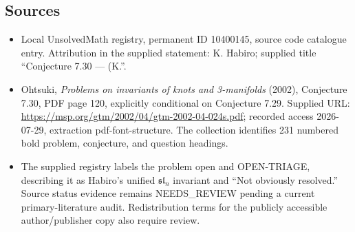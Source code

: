 \documentclass[11pt]{article}
\begin{document}
\subsection{Sources}
\begin{itemize}
\item Local UnsolvedMath registry, permanent ID 10400145, source code catalogue entry. Attribution in the supplied statement: K. Habiro; supplied title ``Conjecture 7.30 --- (K.''.
\item Ohtsuki, \emph{Problems on invariants of knots and 3-manifolds} (2002), Conjecture 7.30, PDF page 120, explicitly conditional on Conjecture 7.29. Supplied URL: \url{https://msp.org/gtm/2002/04/gtm-2002-04-024s.pdf}; recorded access 2026-07-29, extraction pdf-font-structure. The collection identifies 231 numbered bold problem, conjecture, and question headings.
\item The supplied registry labels the problem open and OPEN-TRIAGE, describing it as Habiro's unified \(\mathfrak{sl}_n\) invariant and ``Not obviously resolved.'' Source status evidence remains NEEDS\_REVIEW pending a current primary-literature audit. Redistribution terms for the publicly accessible author/publisher copy also require review.
\end{itemize}
\end{document}
